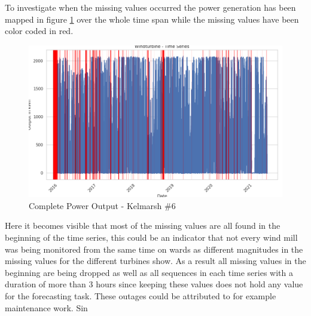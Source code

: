 \documentclass{article}
\begin{document}
To investigate when the missing values occurred the power generation has been mapped in figure \ref{fig:Kelmarsh-missing-values} over the whole time span while the missing values have been color coded in red.
\begin{figure}
    \centering
    \includegraphics[width=\linewidth]{graphs/Windturbine - Time Series.png}
    \caption{Complete Power Output - Kelmarsh \#6}
    \label{fig:Kelmarsh-missing-values}
\end{figure}

Here it becomes visible that most of the missing values are all found in the beginning of the time series, this could be an indicator that not every wind mill was being monitored from the same time on wards as different magnitudes in the missing values for the different turbines show. As a result all missing values in the beginning are being dropped as well as all sequences in each time series with a duration of more than 3 hours since keeping these values does not hold any value for the forecasting task. These outages could be attributed to for example maintenance work. Sin
\end{document}
